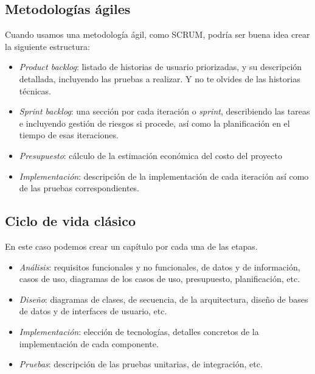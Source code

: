\subsection{Metodologías ágiles}

Cuando usamos una metodología ágil, como SCRUM, podría ser buena idea crear la siguiente estructura:
\begin{itemize}
    \item \textit{Product backlog}: listado de historias de usuario priorizadas, y su descripción detallada, incluyendo las pruebas a realizar. Y no te olvides de las historias técnicas. 
    \item \textit{Sprint backlog}: una sección por cada iteración o \textit{sprint}, describiendo las tareas e incluyendo gestión de riesgos si procede, así como la planificación en el tiempo de esas iteraciones.
    \item \textit{Presupuesto}: cálculo de la estimación económica del costo del proyecto 
    \item \textit{Implementación}: descripción de la implementación de cada iteración así como de las pruebas correspondientes. 
    
\end{itemize}
            
\subsection{Ciclo de vida clásico}
En este caso podemos crear un capítulo por cada una de las etapas.
                \begin{itemize}
                    \item \textit{Análisis}: requisitos funcionales y no funcionales, de datos y de información, casos de uso, diagramas de los casos de uso, presupuesto, planificación, etc.
                    \item \textit{Diseño}: diagramas de clases, de secuencia, de la arquitectura, diseño de bases de datos y de interfaces de usuario, etc.
                    \item \textit{Implementación}: elección de tecnologías, detalles concretos de la implementación de cada componente.
                    \item \textit{Pruebas}: descripción de las pruebas unitarias, de integración, etc.
                \end{itemize}

